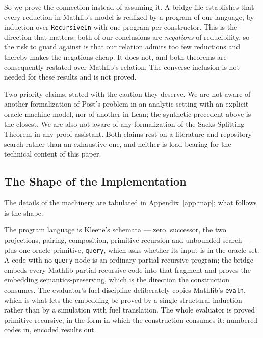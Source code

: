 So we prove the connection instead of assuming it.  A bridge file
establishes that every reduction in Mathlib's model is realized by a
program of our language, by induction over \texttt{RecursiveIn} with one
program per constructor.  This is the direction that matters: both of our
conclusions are \emph{negations} of reducibility, so the risk to guard
against is that our relation admits too few reductions and thereby makes
the negations cheap.  It does not, and both theorems are consequently
restated over Mathlib's relation.  The converse inclusion is not needed for
these results and is not proved.

Two priority claims, stated with the caution they deserve.  We are not
aware of another formalization of Post's problem in an analytic setting
with an explicit oracle machine model, nor of another in Lean; the
synthetic precedent above is the closest.  We are also not aware of any
formalization of the Sacks Splitting Theorem in any proof assistant.  Both
claims rest on a literature and repository search rather than an exhaustive
one, and neither is load-bearing for the technical content of this paper.

\subsection{The Shape of the Implementation}

The details of the machinery are tabulated in
Appendix~\ref{app:map}; what follows is the shape.

The program language is Kleene's schemata --- zero, successor, the two
projections, pairing, composition, primitive recursion and unbounded search
--- plus one oracle primitive, \texttt{query}, which asks whether its input
is in the oracle set.  A code with no \texttt{query} node is an ordinary
partial recursive program; the bridge embeds every Mathlib partial-recursive
code into that fragment and proves the embedding semantics-preserving, which
is the direction the construction consumes.  The evaluator's fuel discipline
deliberately copies
Mathlib's \texttt{evaln}, which is what lets the embedding be proved by a
single structural induction rather than by a simulation with fuel
translation.  The whole evaluator is proved primitive recursive, in the
form in which the construction consumes it: numbered codes in, encoded
results out.

